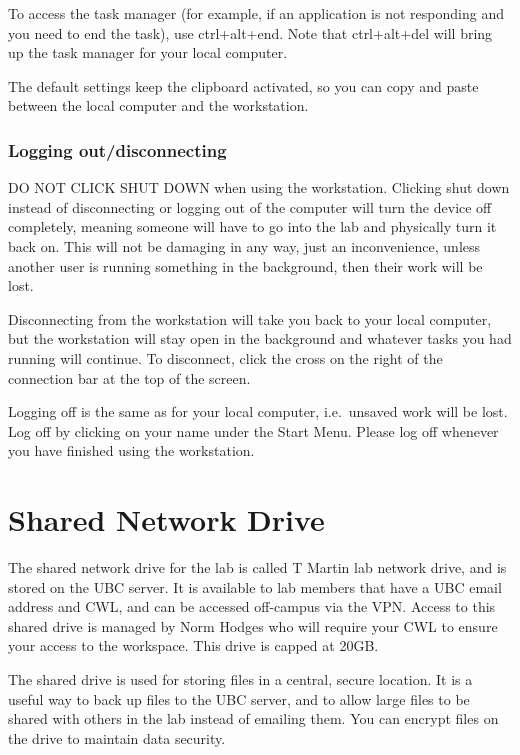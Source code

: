 \documentclass[
]{book}
\begin{document}
To access the task manager (for example, if an application is not responding and you need to end the task), use ctrl+alt+end. Note that ctrl+alt+del will bring up the task manager for your local computer.

The default settings keep the clipboard activated, so you can copy and paste between the local computer and the workstation.

\hypertarget{logging-outdisconnecting}{%
\subsubsection{Logging out/disconnecting}\label{logging-outdisconnecting}}

DO NOT CLICK SHUT DOWN when using the workstation. Clicking shut down instead of disconnecting or logging out of the computer will turn the device off completely, meaning someone will have to go into the lab and physically turn it back on. This will not be damaging in any way, just an inconvenience, unless another user is running something in the background, then their work will be lost.

Disconnecting from the workstation will take you back to your local computer, but the workstation will stay open in the background and whatever tasks you had running will continue. To disconnect, click the cross on the right of the connection bar at the top of the screen.

Logging off is the same as for your local computer, i.e.~unsaved work will be lost. Log off by clicking on your name under the Start Menu. Please log off whenever you have finished using the workstation.

\hypertarget{sharednetworkdrive}{%
\section*{Shared Network Drive}\label{sharednetworkdrive}}

The shared network drive for the lab is called T Martin lab network drive, and is stored on the UBC server. It is available to lab members that have a UBC email address and CWL, and can be accessed off-campus via the VPN. Access to this shared drive is managed by Norm Hodges who will require your CWL to ensure your access to the workspace. This drive is capped at 20GB.

The shared drive is used for storing files in a central, secure location. It is a useful way to back up files to the UBC server, and to allow large files to be shared with others in the lab instead of emailing them. You can encrypt files on the drive to maintain data security.
\end{document}
